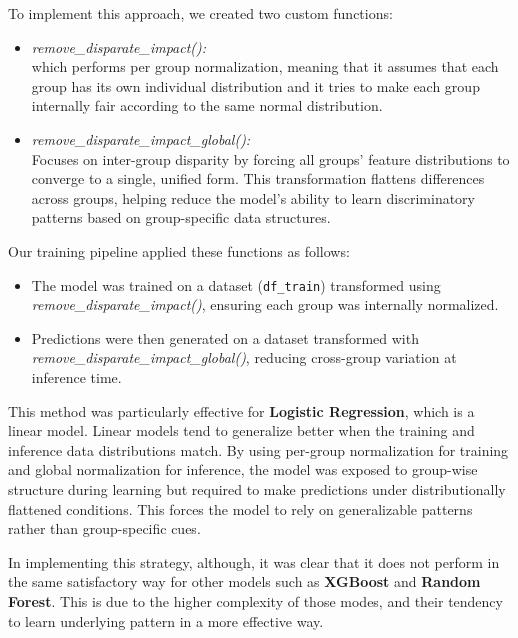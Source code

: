 \documentclass{article}
\begin{document}
To implement this approach, we created two custom functions:

\begin{itemize}
    \item \textit{remove\_disparate\_impact():} \\
    which performs per group normalization, meaning that it assumes that each group has its own individual distribution and it tries to make each group internally fair according to the same normal distribution. 

    \item \textit{remove\_disparate\_impact\_global():} \\
    Focuses on inter-group disparity by forcing all groups’ feature distributions to converge to a single, unified form. This transformation flattens differences across groups, helping reduce the model’s ability to learn discriminatory patterns based on group-specific data structures.
\end{itemize}

Our training pipeline applied these functions as follows:

\begin{itemize}
    \item The model was trained on a dataset (\texttt{df\_train}) transformed using \textit{remove\_disparate\_impact()}, ensuring each group was internally normalized.
    \item Predictions were then generated on a dataset transformed with \textit{remove\_disparate\_impact\_global()}, reducing cross-group variation at inference time.
\end{itemize}

This method was particularly effective for \textbf{Logistic Regression}, which is a linear model. Linear models tend to generalize better when the training and inference data distributions match. By using per-group normalization for training and global normalization for inference, the model was exposed to group-wise structure during learning but required to make predictions under distributionally flattened conditions. This forces the model to rely on generalizable patterns rather than group-specific cues.

In implementing this strategy, although, it was clear that it does not perform in the same satisfactory way for other models such as \textbf{XGBoost} and \textbf{Random Forest}. This is due to the higher complexity of those modes, and their tendency to learn underlying pattern in a more effective way.
\end{document}
